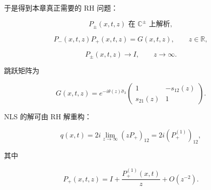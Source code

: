 \documentclass[
    lang=cn,
    scheme=chinese,
    mode=simple,
    device=normal,
    color=blue,
    math=cm,
    thmcnt=section,
    12pt
]{elegantbook}
\begin{document}
于是得到本章真正需要的 RH 问题：

\begin{equation}
    P_\pm(x,t,z)\text{ 在 }\mathbb{C}^\pm\text{ 上解析},
    \tag{5.3.4}
    \label{eq:5.3.4}
\end{equation}

\begin{equation}
    P_-(x,t,z)P_+(x,t,z)
    =
    G(x,t,z),
    \qquad z\in\mathbb{R},
    \tag{5.3.5}
    \label{eq:5.3.5}
\end{equation}

\begin{equation}
    P_\pm(x,t,z)\to I,
    \qquad z\to\infty.
    \tag{5.3.6}
    \label{eq:5.3.6}
\end{equation}

跳跃矩阵为

\begin{equation}
    G(x,t,z)
    =
    e^{-i\theta(z)\widehat{\sigma}_3}
    \begin{pmatrix}
        1         & -s_{12}(z) \\
        s_{21}(z) & 1
    \end{pmatrix}.
    \tag{5.3.7}
    \label{eq:5.3.7}
\end{equation}

NLS 的解可由 RH 解重构：

\begin{equation}
    q(x,t)
    =
    2i\lim\limits_{z\to\infty}(zP_+)_{12}
    =
    2i(P_+^{(1)})_{12},
    \tag{5.3.8}
    \label{eq:5.3.8}
\end{equation}

其中

\begin{equation}
    P_+(x,t,z)
    =
    I+\dfrac{P_+^{(1)}(x,t)}{z}
    +O(z^{-2}).
    \tag{5.3.9}
    \label{eq:5.3.9}
\end{equation}



\end{document}
